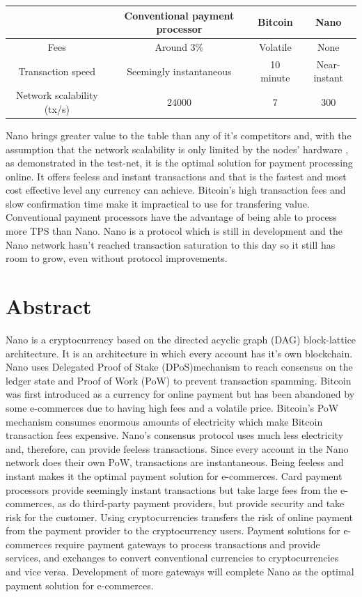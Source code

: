\documentclass{ferseminar}
\begin{document}
\begin{center}
	\begin{tabular}{ |c||c|c|c| }
		\hline
		& Conventional payment processor & Bitcoin & Nano\\ 
		\hline\hline
		Fees & Around 3\% & Volatile & None\\  
		\hline
		Transaction speed & Seemingly instantaneous & 10 minute & Near-instant\\
		\hline
		Network scalability (tx/s) & 24000 & 7 & 300\\
		\hline
	\end{tabular}
\end{center}

Nano brings greater value to the table than any of it's competitors and, with the assumption that the network scalability is only limited by the nodes' hardware \cite{Nano}, as demonstrated in the test-net, it is the optimal solution for payment processing online. It offers feeless and instant transactions and that is the fastest and most cost effective level any currency can achieve.
Bitcoin's high transaction fees and slow confirmation time make it impractical to use for transfering value. 
Conventional payment processors have the advantage of being able to process more TPS than Nano. Nano is a protocol which is still in development and the Nano network hasn't reached transaction saturation to this day so it still has room to grow, even without protocol improvements.

\section{Abstract}
Nano is a cryptocurrency based on the directed acyclic graph (DAG) block-lattice architecture. It is an architecture in which every account has it's own blockchain. Nano uses Delegated Proof of Stake (DPoS)mechanism to reach consensus on the ledger state and Proof of Work (PoW) to prevent transaction spamming. Bitcoin was first introduced as a currency for online payment but has been abandoned by some e-commerces due to having high fees and a volatile price. Bitcoin's PoW mechanism consumes enormous amounts of electricity which make Bitcoin transaction fees expensive. Nano's consensus protocol uses much less electricity and, therefore, can provide feeless transactions. Since every account in the Nano network does their own PoW, transactions are instantaneous. Being feeless and instant makes it the optimal payment solution for e-commerces. Card payment processors provide seemingly instant transactions but take large fees from the e-commerces, as do third-party payment providers, but provide security and take risk for the customer. Using cryptocurrencies transfers the risk of online payment from the payment provider to the cryptocurrency users. Payment solutions for e-commerces require payment gateways to process transactions and provide services, and exchanges to convert conventional currencies to cryptocurrencies and vice versa. Development of more gateways will complete Nano as the optimal payment solution for e-commerces. 
\end{document}
